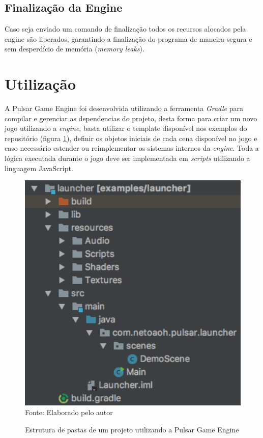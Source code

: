 \documentclass[12pt,	openright, twoside,	a4paper, english, french, spanish, brazil]{abntex2}
\begin{document}
\subsection{Finalização da Engine}
Caso seja enviado um comando de finalização todos os recursos alocados pela engine são liberados, garantindo a finalização do programa de maneira segura e sem desperdício de memória (\textit{memory leaks}). 


%
%

\section{Utilização}

A Pulsar Game Engine foi desenvolvida utilizando a ferramenta \textit{Gradle} para compilar e gerenciar as dependencias do projeto, desta forma para criar um novo jogo utilizando a \textit{engine}, basta utilizar o template disponível nos exemplos do repositório (figura \ref{figura:estrutura-pastas}), definir os objetos iniciais de cada cena disponível no jogo e caso necessário estender ou reimplementar os sistemas internos da \textit{engine}. Toda a lógica executada durante o jogo deve ser implementada em \textit{scripts} utilizando a linguagem JavaScript.

\begin{figure}[H]
\centering
\caption{Estrutura de pastas de um projeto utilizando a Pulsar Game Engine}
\includegraphics[width=12cm]{imagens/estrutura-pastas.png}
\\
\small{Fonte: Elaborado pelo autor}
\label{figura:estrutura-pastas}
\end{figure}
\end{document}
